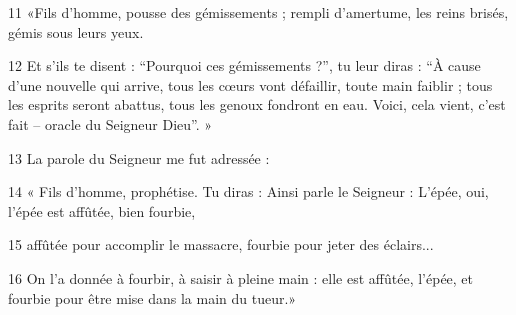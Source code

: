 11 «Fils d’homme, pousse des gémissements ; rempli d’amertume, les reins brisés, gémis sous leurs yeux.

12 Et s’ils te disent : “Pourquoi ces gémissements ?”, tu leur diras : “À cause d’une nouvelle qui arrive, tous les cœurs vont défaillir, toute main faiblir ; tous les esprits seront abattus, tous les genoux fondront en eau. Voici, cela vient, c’est fait – oracle du Seigneur Dieu”. »

13 La parole du Seigneur me fut adressée :

14 « Fils d’homme, prophétise. Tu diras : Ainsi parle le Seigneur : L’épée, oui, l’épée est affûtée, bien fourbie,

15 affûtée pour accomplir le massacre, fourbie pour jeter des éclairs...

16 On l’a donnée à fourbir, à saisir à pleine main : elle est affûtée, l’épée, et fourbie pour être mise dans la main du tueur.»